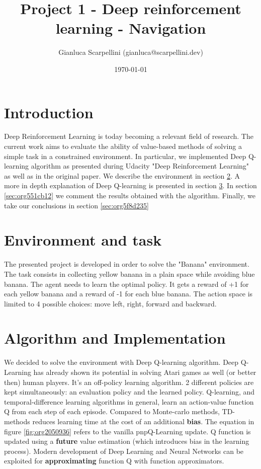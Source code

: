\documentclass[11pt]{article}
\author{Gianluca Scarpellini (gianluca@scarpellini.dev)}
\date{\today}
\title{Project 1 - Deep reinforcement learning - Navigation}
\begin{document}
\maketitle
\tableofcontents


\section{Introduction}
\label{sec:org28be15a}
Deep Reinforcement Learning is today becoming a relevant field of research. The
current work aims to evaluate the ability of value-based methods of solving a
simple task in a constrained environment. In particular, we implemented Deep
Q-learning algorithm as presented during Udacity "Deep Reinforcement Learning"
as well as in the original paper. We describe the environment in section
\ref{sec:org7be0c40}. A more in depth explanation of Deep Q-learning is presented in
section \ref{sec:org84462b5}. In section \ref{sec:org551cb12} we comment the results
obtained with the algorithm. Finally, we take our conclusions in section \ref{sec:org5f8d235}


\section{Environment and task}
\label{sec:org7be0c40}
The presented project is developed in order to solve the "Banana"
environment. The task consists in collecting yellow banana in a plain space
while avoiding blue banana. The agent needs to learn the optimal policy. It gets
a reward of +1 for each yellow banana and a reward of -1 for each blue
banana. The action space is limited to 4 possible choices: move left, right,
forward and backward. 

\section{Algorithm and Implementation}
\label{sec:org84462b5}
We decided to solve the environment with Deep Q-learning algorithm. Deep
Q-Learning has already shown its potential in solving Atari games as well (or
better then) human players. It's an off-policy learning algorithm. 2 different
policies are kept simultaneously: an evaluation policy and the learned
policy. Q-learning, and temporal-difference learning algorithms in general,
learn an action-value function Q from each step of each episode. Compared to
Monte-carlo methods, TD-methods reduces learning time at the cost of an
additional \textbf{bias}. The equation in figure \ref{fig:org2050936} refers to the vanilla
pnpQ-Learning update. Q function is updated using a \textbf{future} value estimation
(which introduces bias in the learning process). Modern development of Deep
Learning and Neural Networks can be exploited for \textbf{approximating} function Q
with function approximators. 
\end{document}
